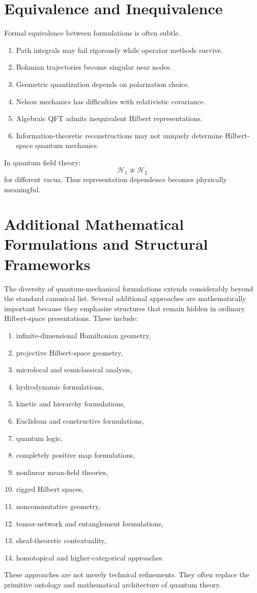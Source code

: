 \section{Equivalence and Inequivalence}
Formal equivalence between formulations is often subtle.
\begin{enumerate}
\item Path integrals may fail rigorously while operator methods survive.
\item Bohmian trajectories become singular near nodes.
\item Geometric quantization depends on polarization choice.
\item Nelson mechanics has difficulties with relativistic covariance.
\item Algebraic QFT admits inequivalent Hilbert representations.
\item Information-theoretic reconstructions may not uniquely determine Hilbert-space quantum mechanics.
\end{enumerate}
In quantum field theory:
\[\mathcal H_1 \not\simeq \mathcal H_2\]
for different vacua.
Thus representation dependence becomes physically meaningful.

\section{Additional Mathematical Formulations and Structural Frameworks}
The diversity of quantum-mechanical formulations extends considerably
beyond the standard canonical list. 
Several additional approaches are mathematically important because they
emphasize structures that remain hidden in ordinary Hilbert-space
presentations.
These include:
\begin{enumerate}
\item infinite-dimensional Hamiltonian geometry,
\item projective Hilbert-space geometry,
\item microlocal and semiclassical analysis,
\item hydrodynamic formulations,
\item kinetic and hierarchy formulations,
\item Euclidean and constructive formulations,
\item quantum logic,
\item completely positive map formulations,
\item nonlinear mean-field theories,
\item rigged Hilbert spaces,
\item noncommutative geometry,
\item tensor-network and entanglement formulations,
\item sheaf-theoretic contextuality,
\item homotopical and higher-categorical approaches.
\end{enumerate}
These approaches are not merely technical refinements. 
They often replace the primitive ontology and mathematical architecture 
of quantum theory.
